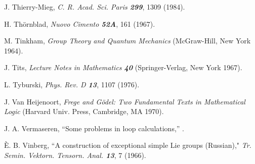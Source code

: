 

 J. Thierry-Mieg,
    {\em C. R. Acad. Sci. Paris \bf 299}, 1309 (1984).

 H. Th{\"o}rnblad,
{\em Nuovo Cimento   \bf 52A}, 161 (1967).

 M. Tinkham,
{\em Group Theory and Quantum Mechanics}
(McGraw-Hill, New York 1964).


J. Tits,
{\em Lecture Notes in Mathematics  \bf 40}
(Springer-Verlag, New York 1967).

 L. Tyburski,
    {\em Phys. Rev. D \bf 13}, 1107 (1976).




 J. Van Heijenoort,
    {\em Frege and G\"odel: Two Fundamental Texts in Mathematical Logic}
    (Harvard Univ. Press, Cambridge, MA 1970).

 J. A. Vermaseren,
    ``Some problems in loop calculations,''
. %


 {\`E}. B. Vinberg,
    ``A construction of exceptional simple Lie groups (Russian),"
    {\em Tr. Semin. Vektorn. Tensorn. Anal. \bf 13}, 7 (1966). %



